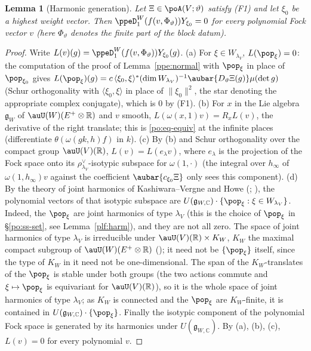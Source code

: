 \documentclass[10pt]{amsart}
\newtheorem{lemma}[theorem]{Lemma}
\theoremstyle{definition}
\theoremstyle{remark}
\newcommand{\C}{\mathbb C}
\newcommand{\R}{\mathbb R}
\begin{document}
\begin{lemma}[Harmonic generation]\label{ppe:harm}
Let $\Xi\in\poA(V;\vartheta)$ satisfy (F1) and let $\xi_0$ be a highest weight vector. Then
$\ppeD^W_1(f(v,\Phi_\vartheta))Y_{\xi_0}=0$ for every polynomial Fock vector $v$ (here
$\Phi_\vartheta$ denotes the finite part of the block datum).
\end{lemma}
\begin{proof}
Write $L(v)(g)=\ppeD^W_1(f(v,\Phi_\vartheta))Y_{\xi_0}(g)$. (a) For $\xi\in W_{\lambda_V}$,
$L(\pop_\xi)=0$: the computation of the proof of Lemma~\ref{ppe:normal} with $\pop_\xi$ in place of
$\pop_{\xi_0}$ gives $L(\pop_\xi)(g)=c\,\langle\xi_0,\xi\rangle^{\ast}(\dim W_{\lambda_V})^{-1}
\aubar{D_\vartheta\Xi(g)}\mu(\det g)$ (Schur orthogonality with $\langle\xi_0,\xi\rangle$ in place
of $\|\xi_0\|^2$, the star denoting the appropriate complex conjugate), which is $0$ by (F1).
(b) For $x$ in the Lie algebra $\mathfrak g_W$ of $\auU(W)(E^+\otimes\R)$ and $v$ smooth,
$L(\omega(x,1)v)=R_xL(v)$, the derivative of the right translate; this is \eqref{po:eq-equiv}
at the infinite places (differentiate $\theta(\omega(gk,h)f)$ in $k$). (c) By (b) and
Schur orthogonality over the compact group $\auU(V)(\R)$, $L(v)=L(e_{\lambda}v)$, where $e_\lambda$
is the projection of the Fock space onto its $\rho_{\lambda_V}^\vee$-isotypic subspace for
$\omega(1,\cdot)$ (the integral over $h_\infty$ of $\omega(1,h_\infty)v$ against the coefficient
$\aubar{c_{\xi_0}\Xi}$ only sees this component). (d) By the theory of joint harmonics of
Kashiwara--Vergne and Howe (\cite[Ch.~III, Lemma~5.3 and Corollary~5.4]{KashiwaraVergne}; \cite[Proposition~3.1, (3.10)(b)]{HoweJAMS}), the polynomial vectors of that isotypic subspace are
$U(\mathfrak g_{W,\C})\cdot\{\pop_\xi:\xi\in W_{\lambda_V}\}$. Indeed, the $\pop_\xi$ are joint harmonics of
type $\lambda_V$ (this is the choice of $\pop_\xi$ in \S\ref{po:ss-set}, see
Lemma~\ref{plf:harm}), and they are not all zero. The space of joint harmonics of type $\lambda_V$ is irreducible
under $\auU(V)(\R)\times K_W$, $K_W$ the maximal compact subgroup of $\auU(W)(E^+\otimes\R)$ (\cite[(3.9)(a)]{HoweJAMS}); it need not be
$\{\pop_\xi\}$ itself, since the type of $K_W$ in it need not be one-dimensional. The span of the $K_W$-translates of
the $\pop_\xi$ is stable under both groups (the two actions commute and $\xi\mapsto\pop_\xi$ is equivariant for
$\auU(V)(\R)$), so it is the whole space of joint harmonics of type $\lambda_V$; as $K_W$ is connected and the
$\pop_\xi$ are $K_W$-finite, it is contained in $U(\mathfrak g_{W,\C})\cdot\{\pop_\xi\}$. Finally the isotypic component of the polynomial Fock space is generated by
its harmonics under $U(\mathfrak g_{W,\C})$. By (a), (b), (c), $L(v)=0$ for every polynomial $v$.
\end{proof}
\end{document}
